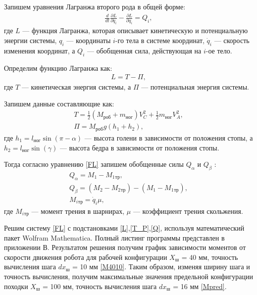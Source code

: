 Запишем уравнения Лагранжа второго рода в общей форме:
\begin{equation}
	\begin{array}{l}
		\displaystyle\frac{d}{dt} \displaystyle\frac{\partial L}{\partial \dot{q}_i} - \displaystyle\frac{\partial L}{\partial q_i} = Q_i,
	\end{array}
	\label{FL}
\end{equation}
где $L$ --- функция Лагранжа, которая описывает кинетическую и потенциальную энергии системы, $q_i$ --- координаты $i$-го тела в системе координат, $\dot{q}_i$ --- скорость изменения координат, а $Q_i$ --- обобщенная сила, действующая на $i$-ое тело.

Определим функцию Лагранжа как:
\begin{equation}
	\begin{array}{l}
		L = T-\Pi,		
	\end{array}
	\label{L}
\end{equation}
где $T$ --- кинетическая энергия системы, а $\Pi$ --- потенциальная энергия системы.

Запишем данные составляющие как:
\begin{equation}
	\begin{array}{l}
		T = \displaystyle\frac{1}{2}(M_{\text{роб}}+m_{\text{ног}})V^{2}_{C}+\displaystyle\frac{1}{2}m_{\text{ног}}V^{2}_{A},
		\\
		\Pi = M_{\text{роб}}g(h_{\text{1}}+h_{\text{2}}),
	\end{array}
	\label{T_P}
\end{equation}
где $h_{\text{1}} = l_{\text{ног}}\sin{(\pi-\alpha)}$ --- высота голени в зависимости от положения стопы, а $h_{\text{2}} = l_{\text{ног}}\sin{(\gamma)}$ --- высота бедра в зависимости от положения стопы.

Тогда согласно уравнению \ref{FL} запишем обобщенные силы $Q_\alpha$ и $Q_\beta$ :
\begin{equation}
	\begin{array}{l}
		Q_\alpha = M_1-M_1{_\text{тр}},
		\\
		Q_\beta = (M_2-M_2{_\text{тр}})-(M_1-M_1{_\text{тр}}), 	
		\\
		M_i{_\text{тр}} = \dot{q}_i \mu,	
	\end{array}
	\label{Q}
\end{equation}
где $M_i{_\text{тр}}$ --- момент трения в шарнирах, $\mu$ --- коэффициент трения скольжения.

Решим систему \ref{FL} с подстановками \ref{L},\ref{T_P},\ref{Q}, используя математический пакет Wolfram Mathematica. Полный листинг программы представлен в приложении В. Результатом решения получим график зависимости моментов от скорости движения робота для рабочей конфигурации $X_{\text{ш}}$ = 40 мм, точность вычисления шага $dx_{\text{ш}}$ = 10 мм  \ref{M4010}. Таким образом, изменяя ширину шага и точность вычисления, получим максимальные значения предельной конфигурации походки  $X_{\text{ш}}$ = 100 мм, точность вычисления шага $dx_{\text{ш}}$ = 16 мм \ref{Mpred}. 

